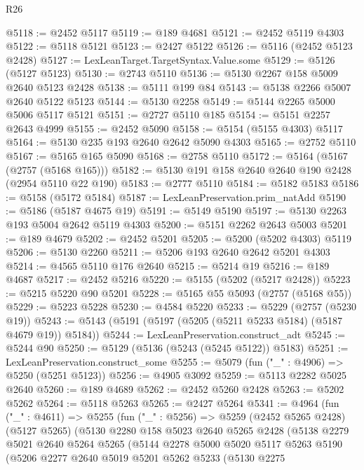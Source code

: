 \begin{lexlean}{R26}
\begin{coremodule}
@5118 := @2452 @5117
@5119 := @189 @4681
@5121 := @2452 @5119 @4303
@5122 := @5118 @5121
@5123 := @2427 @5122
@5126 := @5116 (@2452 @5123 @2428)
@5127 := LexLeanTarget.TargetSyntax.Value.some
@5129 := @5126 (@5127 @5123)
@5130 := @2743 @5110
@5136 := @5130 @2267 @158 @5009 @2640 @5123 @2428
@5138 := @5111 @199 @84
@5143 := @5138 @2266 @5007 @2640 @5122 @5123
@5144 := @5130 @2258
@5149 := @5144 @2265 @5000 @5006 @5117 @5121
@5151 := @2727 @5110 @185
@5154 := @5151 @2257 @2643 @4999
@5155 := @2452 @5090
@5158 := @5154 (@5155 @4303) @5117
@5164 := @5130 @235 @193 @2640 @2642 @5090 @4303
@5165 := @2752 @5110
@5167 := @5165 @165 @5090
@5168 := @2758 @5110
@5172 := @5164 (@5167 (@2757 (@5168 @165)))
@5182 := @5130 @191 @158 @2640 @2640 @190 @2428 (@2954 @5110 @22 @190)
@5183 := @2777 @5110
@5184 := @5182 @5183
@5186 := @5158 (@5172 @5184)
@5187 := LexLeanPreservation.prim_natAdd
@5190 := @5186 (@5187 @4675 @19)
@5191 := @5149 @5190
@5197 := @5130 @2263 @193 @5004 @2642 @5119 @4303
@5200 := @5151 @2262 @2643 @5003
@5201 := @189 @4679
@5202 := @2452 @5201
@5205 := @5200 (@5202 @4303) @5119
@5206 := @5130 @2260
@5211 := @5206 @193 @2640 @2642 @5201 @4303
@5214 := @4565 @5110 @176 @2640
@5215 := @5214 @19
@5216 := @189 @4687
@5217 := @2452 @5216
@5220 := @5155 (@5202 (@5217 @2428))
@5223 := @5215 @5220 @90 @5201
@5228 := @5165 @55 @5093 (@2757 (@5168 @55))
@5229 := @5223 @5228
@5230 := @4584 @5220
@5233 := @5229 (@2757 (@5230 @19))
@5243 := @5143 (@5191 (@5197 (@5205 (@5211 @5233 @5184) (@5187 @4679 @19)) @5184))
@5244 := LexLeanPreservation.construct_adt
@5245 := @5244 @90
@5250 := @5129 (@5136 (@5243 (@5245 @5122)) @5183)
@5251 := LexLeanPreservation.construct_some
@5255 := @5079 (fun ("_" : @4906) => @5250 (@5251 @5123))
@5256 := @4905 @3092
@5259 := @5113 @2282 @5025 @2640
@5260 := @189 @4689
@5262 := @2452 @5260 @2428
@5263 := @5202 @5262
@5264 := @5118 @5263
@5265 := @2427 @5264
@5341 := @4964
    (fun ("_" : @4611) =>
    @5255
      (fun ("_" : @5256) =>
      @5259
        (@2452 @5265 @2428)
        (@5127 @5265)
        (@5130
          @2280
          @158
          @5023
          @2640
          @5265
          @2428
          (@5138
            @2279
            @5021
            @2640
            @5264
            @5265
            (@5144
              @2278
              @5000
              @5020
              @5117
              @5263
              @5190
              (@5206
                @2277
                @2640
                @5019
                @5201
                @5262
                @5233
                (@5130
                  @2275

\end{coremodule}
\end{lexlean}
